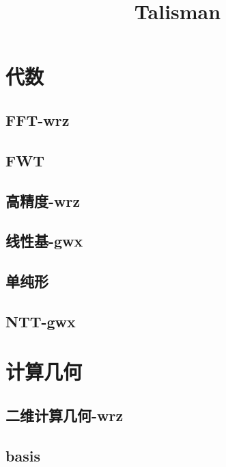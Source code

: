 \documentclass[titlepage,a4paper,10pt]{article}
\title{Talisman}
\begin{document}
	\maketitle
		\setcounter{tocdepth}{3}
		\begingroup
		\let\cleardoublepage\relax
		\let\clearpage\relax
		\renewcommand{\contentsname}{目录}
		\tableofcontents
		\newpage
		\begin{spacing}{0.8}
		\footnotesize
		\section{代数}
			\subsection{FFT-wrz}
				
			\subsection{FWT}
				
			\subsection{高精度-wrz}
				
			\subsection{线性基-gwx}
				
			\subsection{单纯形}
				
			\subsection{NTT-gwx}
				
		\section{计算几何}
			\subsection{二维计算几何-wrz}
				
			\subsection{basis}
				

\end{spacing}
\end{document}
